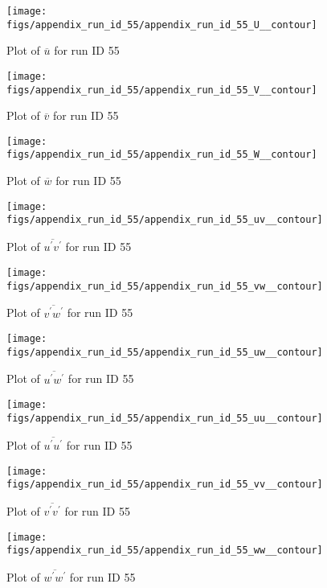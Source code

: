\begin{figure}[H]
\centering
\texttt{[image: figs/appendix\_run\_id\_55/appendix\_run\_id\_55\_U\_\_contour]}
\caption{Plot of $\overline{u}$ for run ID 55}
\label{fig:appendix_run_id_55_U__contour}
\end{figure}


\begin{figure}[H]
\centering
\texttt{[image: figs/appendix\_run\_id\_55/appendix\_run\_id\_55\_V\_\_contour]}
\caption{Plot of $\overline{v}$ for run ID 55}
\label{fig:appendix_run_id_55_V__contour}
\end{figure}


\begin{figure}[H]
\centering
\texttt{[image: figs/appendix\_run\_id\_55/appendix\_run\_id\_55\_W\_\_contour]}
\caption{Plot of $\overline{w}$ for run ID 55}
\label{fig:appendix_run_id_55_W__contour}
\end{figure}


\begin{figure}[H]
\centering
\texttt{[image: figs/appendix\_run\_id\_55/appendix\_run\_id\_55\_uv\_\_contour]}
\caption{Plot of $\overline{u^\prime v^\prime}$ for run ID 55}
\label{fig:appendix_run_id_55_uv__contour}
\end{figure}


\begin{figure}[H]
\centering
\texttt{[image: figs/appendix\_run\_id\_55/appendix\_run\_id\_55\_vw\_\_contour]}
\caption{Plot of $\overline{v^\prime w^\prime}$ for run ID 55}
\label{fig:appendix_run_id_55_vw__contour}
\end{figure}


\begin{figure}[H]
\centering
\texttt{[image: figs/appendix\_run\_id\_55/appendix\_run\_id\_55\_uw\_\_contour]}
\caption{Plot of $\overline{u^\prime w^\prime}$ for run ID 55}
\label{fig:appendix_run_id_55_uw__contour}
\end{figure}


\begin{figure}[H]
\centering
\texttt{[image: figs/appendix\_run\_id\_55/appendix\_run\_id\_55\_uu\_\_contour]}
\caption{Plot of $\overline{u^\prime u^\prime}$ for run ID 55}
\label{fig:appendix_run_id_55_uu__contour}
\end{figure}


\begin{figure}[H]
\centering
\texttt{[image: figs/appendix\_run\_id\_55/appendix\_run\_id\_55\_vv\_\_contour]}
\caption{Plot of $\overline{v^\prime v^\prime}$ for run ID 55}
\label{fig:appendix_run_id_55_vv__contour}
\end{figure}


\begin{figure}[H]
\centering
\texttt{[image: figs/appendix\_run\_id\_55/appendix\_run\_id\_55\_ww\_\_contour]}
\caption{Plot of $\overline{w^\prime w^\prime}$ for run ID 55}
\label{fig:appendix_run_id_55_ww__contour}
\end{figure}



